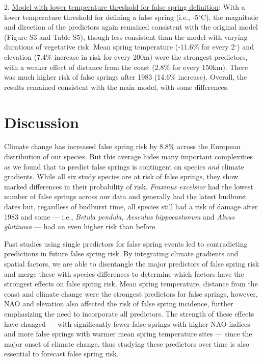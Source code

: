 \documentclass{article}\usepackage[]{graphicx}\usepackage[]{color}
\begin{document}
2. \underline{Model with lower temperature threshold for false spring definition}: With a lower temperature threshold for defining a false spring (i.e., -5$^{\circ}$C), the magnitude and direction of the predictors again remained consistent with the original model (Figure S3 and Table S5), though less consistent than the model with varying durations of vegetative risk. Mean spring temperature (-11.6\% for every 2$^\circ$) and elevation (7.4\% increase in risk for every 200m) were the strongest predictors, with a weaker effect of distance from the coast (2.8\% for every 150km). There was much higher risk of false springs after 1983 (14.6\% increase). Overall, the results remained consistent with the main model, with some differences. %

\section*{Discussion}
Climate change has increased false spring risk by 8.8\% across the European distribution of our species. But this average hides many important complexities as we found that to predict false springs is contingent on species \textit{and} climate gradients. While all six study species are at risk of false springs, they show marked differences in their probability of risk. \textit{Fraxinus excelsior} had the lowest number of false springs across our data and generally had the latest budburst dates but, regardless of budburst time, all species still had a risk of damage after 1983 and some  --- i.e., \textit{Betula pendula}, \textit{Aesculus hippocastanum} and \textit{Alnus glutinosa} --- had an even higher risk than before. 

Past studies using single predictors for false spring events \citep{Liu2018, Ma2018, Vitasse2018, Vitra2017, Wypych2016a} led to contradicting predictions in future false spring risk. By integrating climate gradients and spatial factors, we are able to disentangle the major predictors of false spring risk and merge these with species differences to determine which factors have the strongest effects on false spring risk. Mean spring temperature, distance from the coast and climate change were the strongest predictors for false springs, however, NAO and elevation also affected the risk of false spring incidence, further emphasizing the need to incorporate all predictors. The strength of these effects have changed --- with significantly fewer false springs with higher NAO indices and more false springs with warmer mean spring temperature sites --- since the major onset of climate change, thus studying these predictors over time is also essential to forecast false spring risk.
\end{document}
